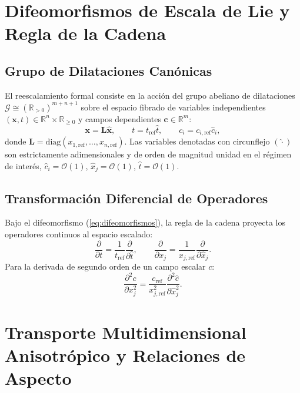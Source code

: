 \documentclass[11pt,a4paper]{article}
\begin{document}
\section{Difeomorfismos de Escala de Lie y Regla de la Cadena}

\subsection{Grupo de Dilataciones Canónicas}
El reescalamiento formal consiste en la acción del grupo abeliano de dilataciones $\mathcal{G} \cong (\mathbb{R}_{>0})^{m+n+1}$ sobre el espacio fibrado de variables independientes $(\mathbf{x}, t) \in \mathbb{R}^n \times \mathbb{R}_{\ge 0}$ y campos dependientes $\mathbf{c} \in \mathbb{R}^m$:
\begin{equation}
\mathbf{x} = \mathbf{L} \hat{\mathbf{x}}, \qquad t = t_{\mathrm{ref}} \hat{t}, \qquad c_i = c_{i,\mathrm{ref}} \hat{c}_i,
\label{eq:difeomorfismos}
\end{equation}
donde $\mathbf{L} = \mathrm{diag}(x_{1,\mathrm{ref}}, \dots, x_{n,\mathrm{ref}})$. Las variables denotadas con circunflejo $(\hat{\cdot})$ son estrictamente adimensionales y de orden de magnitud unidad en el régimen de interés, $\hat{c}_i = \mathcal{O}(1)$, $\hat{x}_j = \mathcal{O}(1)$, $\hat{t} = \mathcal{O}(1)$.

\subsection{Transformación Diferencial de Operadores}
Bajo el difeomorfismo (\ref{eq:difeomorfismos}), la regla de la cadena proyecta los operadores continuos al espacio escalado:
\begin{equation}
\frac{\partial}{\partial t} = \frac{1}{t_{\mathrm{ref}}} \frac{\partial}{\partial \hat{t}}, \qquad \frac{\partial}{\partial x_j} = \frac{1}{x_{j,\mathrm{ref}}} \frac{\partial}{\partial \hat{x}_j}.
\end{equation}
Para la derivada de segundo orden de un campo escalar $c$:
\begin{equation}
\frac{\partial^2 c}{\partial x_j^2} = \frac{c_{\mathrm{ref}}}{x_{j,\mathrm{ref}}^2} \frac{\partial^2 \hat{c}}{\partial \hat{x}_j^2}.
\end{equation}

\section{Transporte Multidimensional Anisotrópico y Relaciones de Aspecto}
\end{document}
